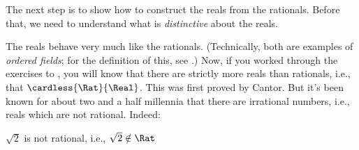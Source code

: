 \documentclass[../../../include/open-logic-section]{subfiles}
\begin{document}

The next step is to show how to construct the reals from the
rationals. Before that, we need to understand what is
\emph{distinctive} about the reals. 

The reals behave very much like the rationals. (Technically, both are
examples of \emph{ordered fields}; for the definition of this, see
.) Now, if you worked through the exercises
to , you will know that there are strictly
more reals than rationals, i.e., that $\cardless{\Rat}{\Real}$. This
was first proved by Cantor. But it's been known for about two and a
half millennia that there are irrational numbers, i.e., reals which
are not rational. Indeed:
\begin{thm}
$\sqrt{2}$ is not rational, i.e., $\sqrt{2} \notin \Rat$
\end{thm}
\end{document}
